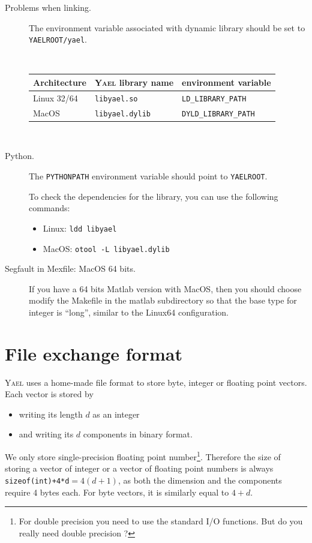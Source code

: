 \documentclass[a4paper,11pt,notitlepage,final,twoside]{report}
\newcommand{\yael}{\textsc{Yael}\xspace}
\newcommand{\yroot}{\texttt{YAELROOT}\xspace}
\newcommand{\tc}[1]{\texttt{#1}}
\begin{document}
\begin{description}
\item [Problems when linking.] The environment variable associated with dynamic library should be set to \tc{\yroot/yael}. 

{~ \hfill 
\begin{tabular}{|lll|}
\hline
Architecture & \yael library name  &  environment variable  \\
\hline
Linux 32/64  & \tc{libyael.so}  & \tc{LD\_LIBRARY\_PATH} \\
MacOS       & \tc{libyael.dylib} & \tc{DYLD\_LIBRARY\_PATH} \\
\hline
\end{tabular} \hfill ~}

\item [Python.] The \tc{PYTHONPATH} environment variable should 
point to \tc{YAELROOT}. 


To check the dependencies for the library, you can use the following commands:
\begin{itemize}
\item Linux: \tc{ldd libyael}
\item MacOS: \tc{otool -L libyael.dylib}
\end{itemize}

\item [Segfault in Mexfile: MacOS 64 bits.] If you have a 64 bits Matlab version with MacOS, 
then you should choose modify the Makefile in the matlab subdirectory so that 
the base type for integer is ``long'', similar to the Linux64 configuration. 
\end{description}


\appendix                     %

\chapter{File exchange format}               %
\label{cha:I/O}

\yael uses a home-made file format to store byte, integer or floating point vectors. 
Each vector is stored by
\begin{itemize}
\item writing its length $d$ as an integer
\item and writing its $d$ components in binary format. 
\end{itemize}
We only store single-precision floating point number\footnote{For
  double precision you need to use the standard I/O functions. But do
  you really need double precision ?}. Therefore the size of storing a
vector of integer or a vector of floating point numbers is always
\tc{sizeof(int)+4*d}$=4(d+1)$, as both the dimension and the
components require 4 bytes each. 
For byte vectors, it is similarly equal to $4+d$. 
 \medskip
\end{document}
